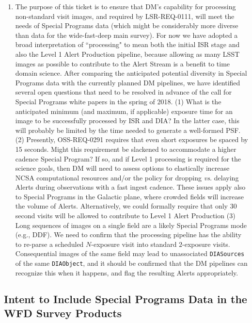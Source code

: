 \documentclass[DM,lsstdraft,toc]{lsstdoc}
\begin{document}
\begin{enumerate}[resume,topsep=-10pt,after=\vspace{10pt},label= \textbf{Action \Roman*}] \item \label{NSV-1} The purpose of this ticket is to ensure that DM's capability for processing non-standard visit images, and required by LSR-REQ-0111, will meet the needs of Special Programs data (which might be considerably more diverse than data for the wide-fast-deep main survey). For now we have adopted a broad interpretation of ``processing" to mean both the initial ISR stage and also the Level 1 Alert Production pipeline, because allowing as many LSST images as possible to contribute to the Alert Stream is a benefit to time domain science. After comparing the anticipated potential diversity in Special Programs data with the currently planned DM pipelines, we have identified several open questions that need to be resolved in advance of the call for Special Programs white papers in the spring of 2018. (1) What is the anticipated minimum (and maximum, if applicable) exposure time for an image to be successfully processed by ISR and DIA? In the latter case, this will probably be limited by the time needed to generate a well-formed PSF. (2) Presently, OSS-REQ-0291 requires that even short exposures be spaced by 15 seconds. Might this requirement be slackened to accommodate a higher cadence Special Program? If so, and if Level 1 processing is required for the science goals, then DM will need to assess options to elastically increase NCSA computational resources and/or the policy for dropping {\it vs.} delaying Alerts during observations with a fast ingest cadence. These issues apply also to Special Programs in the Galactic plane, where crowded fields will increase the volume of Alerts. Alternatively, we could formally require that only 30 second visits will be allowed to contribute to Level 1 Alert Production (3) Long sequences of images on a single field are a likely Special Programs mode (e.g., DDF). We need to confirm that the processing pipeline has the ability to re-parse a scheduled $N$-exposure visit into standard $2$-exposure visits. Consequential images of the same field may lead to unassociated {\tt DIASources} of the same {\tt DIAObject}, and it should be confirmed that the DM pipelines can recognize this when it happens, and flag the resulting Alerts appropriately. \end{enumerate}


\subsection{Intent to Include Special Programs Data in the WFD Survey Products}\label{ssec:dmplans_WFD}
\end{document}
